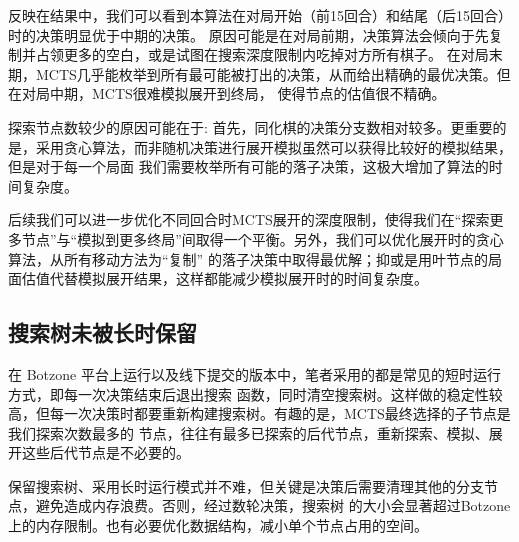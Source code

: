 \documentclass[12pt]{ctexart}
\begin{document}
	反映在结果中，我们可以看到本算法在对局开始（前15回合）和结尾（后15回合）时的决策明显优于中期的决策。
	原因可能是在对局前期，决策算法会倾向于先复制并占领更多的空白，或是试图在搜索深度限制内吃掉对方所有棋子。
	在对局末期，MCTS几乎能枚举到所有最可能被打出的决策，从而给出精确的最优决策。但在对局中期，MCTS很难模拟展开到终局，
	使得节点的估值很不精确。

	探索节点数较少的原因可能在于: 首先，同化棋的决策分支数相对较多。更重要的是，采用贪心算法，而非随机决策进行展开模拟虽然可以获得比较好的模拟结果，但是对于每一个局面
	我们需要枚举所有可能的落子决策，这极大增加了算法的时间复杂度。

	后续我们可以进一步优化不同回合时MCTS展开的深度限制，使得我们在“探索更多节点”与“模拟到更多终局”间取得一个平衡。另外，我们可以优化展开时的贪心算法，从所有移动方法为“复制”
	的落子决策中取得最优解；抑或是用叶节点的局面估值代替模拟展开结果，这样都能减少模拟展开时的时间复杂度。
		

	\subsection{搜索树未被长时保留}
	在 Botzone 平台上运行以及线下提交的版本中，笔者采用的都是常见的短时运行方式，即每一次决策结束后退出搜索
	函数，同时清空搜索树。这样做的稳定性较高，但每一次决策时都要重新构建搜索树。有趣的是，MCTS最终选择的子节点是我们探索次数最多的
	节点，往往有最多已探索的后代节点，重新探索、模拟、展开这些后代节点是不必要的。

	保留搜索树、采用长时运行模式并不难，但关键是决策后需要清理其他的分支节点，避免造成内存浪费。否则，经过数轮决策，搜索树
	的大小会显著超过Botzone上的内存限制。也有必要优化数据结构，减小单个节点占用的空间。
	
\end{document}
